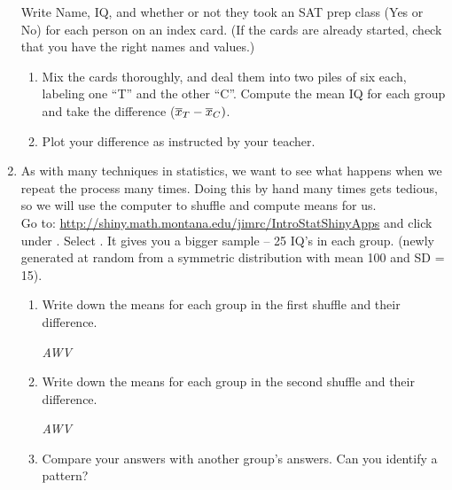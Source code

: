 \begin{enumerate}
Write Name, IQ, and whether or not they took an SAT prep class (Yes or
No) for each person on an index card.
(If the cards are already started, check that you have the right
names and values.)  
   \begin{enumerate}
   \item Mix the cards thoroughly, and deal them into two piles of six
     each, labeling one ``T'' and the other ``C''.
     Compute the mean IQ for each group and take the difference
     ($\overline{x}_T - \overline{x}_C)$.\vspace{1cm}
   \item Plot your difference as instructed by your teacher. \vspace{1cm} 
\end{enumerate}

\item As with many techniques in statistics, we want to see what
  happens when we repeat the process many times.  Doing this by hand
  many times gets tedious, so we will use the computer to shuffle and
  compute means for us. \\ Go to:
  \url{http://shiny.math.montana.edu/jimrc/IntroStatShinyApps} and click
    under .
   Select . It gives you a bigger sample -- 25 IQ's in each
   group. (newly generated at random from a symmetric distribution
   with mean 100 and SD = 15).
   \begin{enumerate}
   \item Write down the means for each group in the first shuffle and
     their difference.
\begin{students}
 \vspace{1cm}
\end{students}

\begin{key}
 {\it AWV}
\end{key}

   \item Write down the means for each group in the second shuffle and
     their difference.
\begin{students}
 \vspace{1cm}
\end{students}

\begin{key}
 {\it AWV}
\end{key}
\item Compare your answers with another group's answers.  Can you
  identify a pattern?
\begin{students}
 \vspace{1cm}
\end{students}


\end{enumerate}
\end{enumerate}

